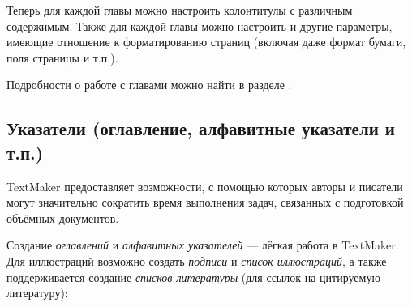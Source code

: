 ﻿\documentclass[a4paper,10pt]{article}
\begin{document}
 Теперь для каждой главы можно настроить колонтитулы с различным содержимым. Также для каждой главы можно настроить и другие параметры, имеющие отношение к форматированию страниц (включая даже формат бумаги, поля страницы и т.п.).
 
 Подробности о работе с главами можно найти в разделе .

\subsection{Указатели (оглавление, алфавитные указатели и т.п.)}
TextMaker предоставляет возможности, с помощью которых авторы и писатели могут значительно сократить время выполнения задач, связанных с подготовкой объёмных документов.

Создание \textit{оглавлений} и \textit{алфавитных указателей} — лёгкая работа в TextMaker. Для иллюстраций возможно создать \textit{подписи} и \textit{список иллюстраций}, а также поддерживается создание \textit{списков литературы} (для ссылок на цитируемую литературу):
\end{document}
